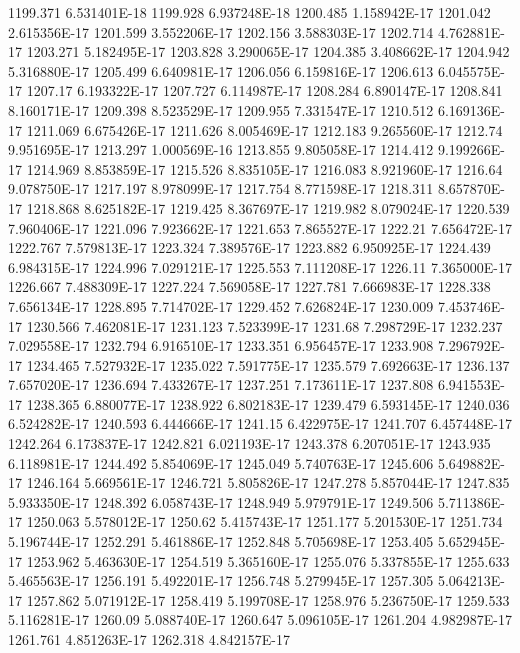 1199.371  6.531401E-18
1199.928  6.937248E-18
1200.485  1.158942E-17
1201.042  2.615356E-17
1201.599  3.552206E-17
1202.156  3.588303E-17
1202.714  4.762881E-17
1203.271  5.182495E-17
1203.828  3.290065E-17
1204.385  3.408662E-17
1204.942  5.316880E-17
1205.499  6.640981E-17
1206.056  6.159816E-17
1206.613  6.045575E-17
1207.17  6.193322E-17
1207.727  6.114987E-17
1208.284  6.890147E-17
1208.841  8.160171E-17
1209.398  8.523529E-17
1209.955  7.331547E-17
1210.512  6.169136E-17
1211.069  6.675426E-17
1211.626  8.005469E-17
1212.183  9.265560E-17
1212.74  9.951695E-17
1213.297  1.000569E-16
1213.855  9.805058E-17
1214.412  9.199266E-17
1214.969  8.853859E-17
1215.526  8.835105E-17
1216.083  8.921960E-17
1216.64  9.078750E-17
1217.197  8.978099E-17
1217.754  8.771598E-17
1218.311  8.657870E-17
1218.868  8.625182E-17
1219.425  8.367697E-17
1219.982  8.079024E-17
1220.539  7.960406E-17
1221.096  7.923662E-17
1221.653  7.865527E-17
1222.21  7.656472E-17
1222.767  7.579813E-17
1223.324  7.389576E-17
1223.882  6.950925E-17
1224.439  6.984315E-17
1224.996  7.029121E-17
1225.553  7.111208E-17
1226.11  7.365000E-17
1226.667  7.488309E-17
1227.224  7.569058E-17
1227.781  7.666983E-17
1228.338  7.656134E-17
1228.895  7.714702E-17
1229.452  7.626824E-17
1230.009  7.453746E-17
1230.566  7.462081E-17
1231.123  7.523399E-17
1231.68  7.298729E-17
1232.237  7.029558E-17
1232.794  6.916510E-17
1233.351  6.956457E-17
1233.908  7.296792E-17
1234.465  7.527932E-17
1235.022  7.591775E-17
1235.579  7.692663E-17
1236.137  7.657020E-17
1236.694  7.433267E-17
1237.251  7.173611E-17
1237.808  6.941553E-17
1238.365  6.880077E-17
1238.922  6.802183E-17
1239.479  6.593145E-17
1240.036  6.524282E-17
1240.593  6.444666E-17
1241.15  6.422975E-17
1241.707  6.457448E-17
1242.264  6.173837E-17
1242.821  6.021193E-17
1243.378  6.207051E-17
1243.935  6.118981E-17
1244.492  5.854069E-17
1245.049  5.740763E-17
1245.606  5.649882E-17
1246.164  5.669561E-17
1246.721  5.805826E-17
1247.278  5.857044E-17
1247.835  5.933350E-17
1248.392  6.058743E-17
1248.949  5.979791E-17
1249.506  5.711386E-17
1250.063  5.578012E-17
1250.62  5.415743E-17
1251.177  5.201530E-17
1251.734  5.196744E-17
1252.291  5.461886E-17
1252.848  5.705698E-17
1253.405  5.652945E-17
1253.962  5.463630E-17
1254.519  5.365160E-17
1255.076  5.337855E-17
1255.633  5.465563E-17
1256.191  5.492201E-17
1256.748  5.279945E-17
1257.305  5.064213E-17
1257.862  5.071912E-17
1258.419  5.199708E-17
1258.976  5.236750E-17
1259.533  5.116281E-17
1260.09  5.088740E-17
1260.647  5.096105E-17
1261.204  4.982987E-17
1261.761  4.851263E-17
1262.318  4.842157E-17
